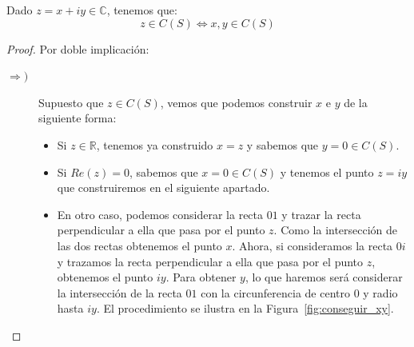 \begin{lema}\label{lema:real_im}
    Dado $z=x+iy\in \mathbb{C}$, tenemos que:
    \begin{equation*}
        z\in C(S) \Longleftrightarrow x,y\in C(S)
    \end{equation*}
    \begin{proof}
        Por doble implicación:
        \begin{description}
            \item [$\Longrightarrow )$] Supuesto que $z\in C(S)$, vemos que podemos construir $x$ e $y$ de la siguiente forma:
                \begin{itemize}
                    \item Si $z\in \mathbb{R}$, tenemos ya construido $x=z$ y sabemos que $y=0\in C(S)$.
                    \item Si $Re(z) = 0$, sabemos que $x=0\in C(S)$ y tenemos el punto $z=iy$ que construiremos en el siguiente apartado.
                    \item En otro caso, podemos considerar la recta $01$ y trazar la recta perpendicular a ella que pasa por el punto $z$. Como la intersección de las dos rectas obtenemos el punto $x$. Ahora, si consideramos la recta $0i$ y trazamos la recta perpendicular a ella que pasa por el punto $z$, obtenemos el punto $iy$. Para obtener $y$, lo que haremos será considerar la intersección de la recta $01$ con la circunferencia de centro $0$ y radio hasta $iy$. El procedimiento se ilustra en la Figura~\ref{fig:conseguir_xy}.
                        \begin{figure}
                            \centering
\end{figure}
\end{itemize}
\end{description}
\end{proof}
\end{lema}
